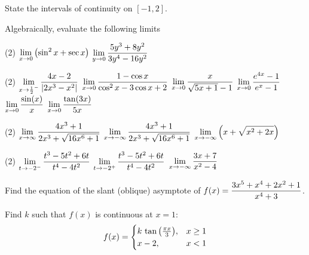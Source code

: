\documentclass[mathNotesPreamble]{subfiles}
\begin{document}
  \vspace*{15pt}
  State the intervals of continuity on $[-1,2]$.
  \begin{ex*}
    Algebraically, evaluate the following limits
  \end{ex*}
  \begin{tasks}[after-item-skip=\stretch{1}, label=](2)
    \task $\displaystyle\lim_{x\to 0}{\left(\sin^2 x+\sec x\right)}$
    \task $\displaystyle\lim_{y\to 0}\frac{5y^3+8y^2}{3y^4-16y^2}$
  \end{tasks}
  \pagebreak
  
  \begin{tasks}[after-item-skip=\stretch{1}, label=](2)
    \task $\displaystyle\lim_{x\to \frac{1}{2}^-} \frac{4x-2}{{\left\vert2x^3-x^2\right\vert}}$
    \task $\displaystyle\lim_{x\to 0} \frac{1-\cos x}{\cos^2 x-3\cos x+2}$
    \task $\displaystyle\lim_{x\to 0} \frac{x}{\sqrt{5x+1}-1}$
    \task $\displaystyle\lim_{x\to 0} \frac{e^{4x}-1}{e^{x}-1}$
    \task $\displaystyle\lim_{x\to 0} \frac{\sin(x)}{x}$
    \task $\displaystyle\lim_{x\to 0} \frac{\tan(3x)}{5x}$
  \end{tasks}
  \pagebreak
  
  \begin{tasks}[after-item-skip=\stretch{1}, label=](2)
    \task $\displaystyle\lim_{x\to \infty} \frac{4x^3+1}{2x^3+\sqrt{16x^6+1}}$
    \task $\displaystyle\lim_{x\to -\infty} \frac{4x^3+1}{2x^3+\sqrt{16x^6+1}}$
    \task $\displaystyle\lim_{x\to -\infty} {\left(x+\sqrt{x^2+2x}\right)}$
  \end{tasks}
  \pagebreak
  
  \begin{tasks}[after-item-skip=\stretch{1}, label=](2)
    \task $\displaystyle\lim_{t\to -2^-} \frac{t^3-5t^2+6t}{t^4-4t^2}$
    \task $\displaystyle\lim_{t\to -2^+} \frac{t^3-5t^2+6t}{t^4-4t^2}$
    \task $\displaystyle\lim_{x\to -\infty} \frac{3x+7}{x^2-4}$
  \end{tasks}
  \pagebreak
  
  Find the equation of the slant (oblique) asymptote of $\displaystyle f(x)=\frac{3x^5+x^4+2x^2+1}{x^4+3}$.
  \pagebreak
  
  Find $k$ such that $f(x)$ is continuous at $x=1$:
    $$f(x)=\begin{cases}
      k\,\tan{\left(\frac{\pi x}{3}\right)},& x\geq 1\\
      x-2,& x<1
    \end{cases}$$
  
\end{document}
